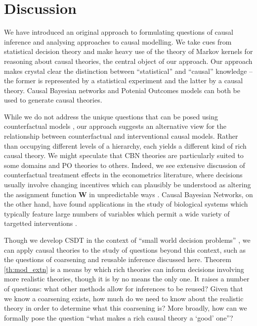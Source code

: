 
\section{Discussion}

We have introduced an original approach to formulating questions of causal inference and analysing approaches to causal modelling. We take cues from statistical decision theory and make heavy use of the theory of Markov kernels for reasoning about causal theories, the central object of our approach. Our approach makes crystal clear the distinction between ``statistical'' and ``causal'' knowledge -- the former is represented by a statistical experiment and the latter by a causal theory. Causal Bayesian networks and Potenial Outcomes models can both be used to generate causal theories.

While we do not address the unique questions that can be posed using counterfactual models \citep{pearl_causality:_2009}, our approach suggests an alternative view for the relationship between counterfactual and interventional causal models. Rather than occupying different levels of a hierarchy, each yields a different kind of rich causal theory. We might speculate that CBN theories are particularly suited to some domains and PO theories to others. Indeed, we see extensive discussion of counterfactual treatment effects in the econometrics literature, where decisions usually involve changing incentives which can plausibly be understood as altering the assignment function $\mathbf{W}$ in unpredictable ways \citep{angrist_mastering_2014,carneiro_evaluating_2010,imbens_identification_1994}. Causal Bayesian Networks, on the other hand, have found applications in the study of biological systems which typically feature large numbers of variables which permit a wide variety of targetted interventions \citep{sachs_causal_2005,maathuis_estimating_2009}.

Though we develop CSDT in the context of ``small world decision problems'' \citep{joyce_foundations_1999}, we can apply causal theories to the study of questions beyond this context, such as the questions of coarsening and reusable inference discussed here. Theorem \ref{th:mod_extn} is a means by which rich theories can inform decisions involving more realistic theories, though it is by no means the only one. It raises a number of questions: what other methods allow for inferences to be reused? Given that we know a coarsening exists, how much do we need to know about the realistic theory in order to determine what this coarsening is? More broadly, how can we formally pose the question ``what makes a rich causal theory a `good' one''?


